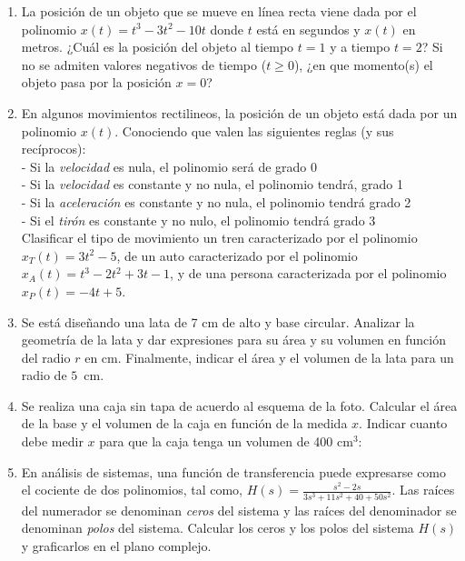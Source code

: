 \documentclass[a4paper]{article}
\newcommand{\df}[2]{\displaystyle\frac{#1}{#2}}
\newcommand{\img}[2]{ \begin{minipage}[t]{\linewidth} \raisebox{-\height}{\texttt{[image: \#2]}} \end{minipage} }
\begin{document}
\begin{enumerate}
	\begin{enumerate} [label=(\alph*)]
		\item La posición de un objeto que se mueve en línea recta viene dada por el polinomio $x(t) = t^3 - 3t^2 -10t$ donde $t$ está en segundos y $x(t)$ en metros. ¿Cuál es la posición del objeto al tiempo $t=1$ y a tiempo $t=2$? Si no se admiten valores negativos de tiempo ($t \geq 0$), ¿en que momento(s) el objeto pasa por la posición $x=0$?
		\item En algunos movimientos rectilineos, la posición de un objeto está dada por un polinomio $x(t)$. Conociendo que valen las siguientes reglas (y sus recíprocos): \\ - Si la \textit{velocidad} es nula, el polinomio será de grado 0 \\ - Si la \textit{velocidad} es constante y no nula, el polinomio tendrá, grado 1 \\ - Si la \textit{aceleración} es constante y no nula, el polinomio tendrá grado 2 \\ - Si el \textit{tirón} es constante y no nulo, el polinomio tendrá grado 3 \\ Clasificar el tipo de movimiento un tren caracterizado por el polinomio $x_T(t)=3t^2-5$, de un auto caracterizado por el polinomio $x_A(t)=t^3-2t^2+3t-1$, y de una persona caracterizada por el polinomio $x_P(t)=-4t+5$.
		\item Se está diseñando una lata de 7 cm de alto y base circular. Analizar la geometría de la lata y dar expresiones para su área y su volumen en función del radio $r$ en cm. Finalmente, indicar el área y el volumen de la lata para un radio de $5$~cm.
		\item Se realiza una caja sin tapa de acuerdo al esquema de la foto. Calcular el área de la base y el volumen de la caja en función de la medida $x$. Indicar cuanto debe medir $x$ para que la caja tenga un volumen de 400 cm$^3$: \img{0.5\textwidth}{img/box.png} 
		\item En análisis de sistemas, una función de transferencia puede expresarse como el cociente de dos polinomios, tal como, $H(s)=\df{s^2-2s}{3s^3+11s^2+40+50s^2}$. Las raíces del numerador se denominan \textit{ceros} del sistema y las raíces del denominador se denominan \textit{polos} del sistema. Calcular los ceros y los polos del sistema $H(s)$ y graficarlos en el plano complejo.

\end{enumerate}
\end{enumerate}
\end{document}
